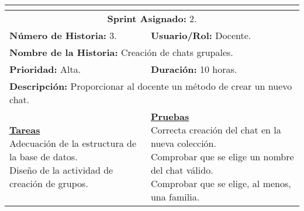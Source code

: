 \resizebox{15cm}{!} {
	\begin{tabular}{|l|l|}
		\hline
		\multicolumn{2}{|c|}{\cellcolor[HTML]{343434}{\color[HTML]{FFFFFF} \textbf{Historia de Usuario}}} \\
		\hline
		\multicolumn{2}{|c|}{\textbf{Sprint Asignado:} 2.} \\
		\hline
		\textbf{Número de Historia:} 3. & \textbf{Usuario/Rol:} Docente.\\
		\hline
		\multicolumn{2}{|l|}{\textbf{Nombre de la Historia:} Creación de chats grupales.} \\
		\hline
		\textbf{Prioridad:} Alta. & \textbf{Duración:} 10 horas.\\
		\hline
		\multicolumn{2}{|l|}{\textbf{Descripción:} Proporcionar al docente un método de crear un nuevo chat.} \\
		\hline
		\specialcell{\underline{\textbf{Tareas}} \\ Adecuación de la estructura de la base de datos. \\ Diseño de la actividad de creación de grupos.} & \specialcell{\underline{\textbf{Pruebas}} \\ Correcta creación del chat en la nueva colección. \\ Comprobar que se elige un nombre del chat válido. \\ Comprobar que se elige, al menos, una familia.} \\
		\hline
	\end{tabular}
}


